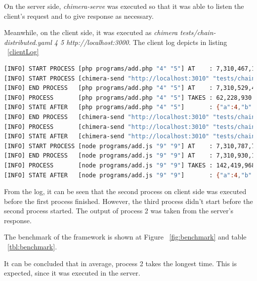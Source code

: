 \documentclass[conference]{IEEEtran}
\begin{document}
On the server side, {\it chimera-serve} was executed so that it was able to listen the client's request
and to give response as necessary.

Meanwhile, on the client side, it was executed as {\it chimera tests/chain-distributed.yaml 4 5 http://localhost:3000}. The client log depicts in listing ~\ref{clientLog} 

\begin{lstlisting}[caption=Client Log, label=clientLog, language=bash, basicstyle=\small, breaklines=true]
[INFO] START PROCESS [php programs/add.php "4" "5"] AT    : 7,310,467,197,740
[INFO] START PROCESS [chimera-send "http://localhost:3010" "tests/chain-add.yaml" "4" "5"] AT    : 7,310,489,588,596
[INFO] END PROCESS   [php programs/add.php "4" "5"] AT    : 7,310,529,490,373
[INFO] PROCESS       [php programs/add.php "4" "5"] TAKES : 62,228,930 NS
[INFO] STATE AFTER   [php programs/add.php "4" "5"]       : {"a":4,"b":5,"server":"http://localhost:3010","c":9}
[INFO] END PROCESS   [chimera-send "http://localhost:3010" "tests/chain-add.yaml" "4" "5"] AT    : 7,310,786,490,287
[INFO] PROCESS       [chimera-send "http://localhost:3010" "tests/chain-add.yaml" "4" "5"] TAKES : 296,877,900 NS
[INFO] STATE AFTER   [chimera-send "http://localhost:3010" "tests/chain-add.yaml" "4" "5"]       : {"a":4,"b":5,"server":"http://localhost:3010","c":9,"d":9}
[INFO] START PROCESS [node programs/add.js "9" "9"] AT    : 7,310,787,707,145
[INFO] END PROCESS   [node programs/add.js "9" "9"] AT    : 7,310,930,153,276
[INFO] PROCESS       [node programs/add.js "9" "9"] TAKES : 142,419,968 NS
[INFO] STATE AFTER   [node programs/add.js "9" "9"]       : {"a":4,"b":5,"server":"http://localhost:3010","c":9,"d":9,"e":18}
\end{lstlisting}

From the log, it can be seen that the second process on client side was executed before the first process finished.
However, the third process didn't start before the second process started. The output of process 2  was taken from the
server's response.

The benchmark of the framework is shown at Figure ~\ref{fig:benchmark} and table ~\ref{tbl:benchmark}.

It can be concluded that in average, process 2 takes the longest time. This is expected, since it was executed in the server. 
\end{document}
